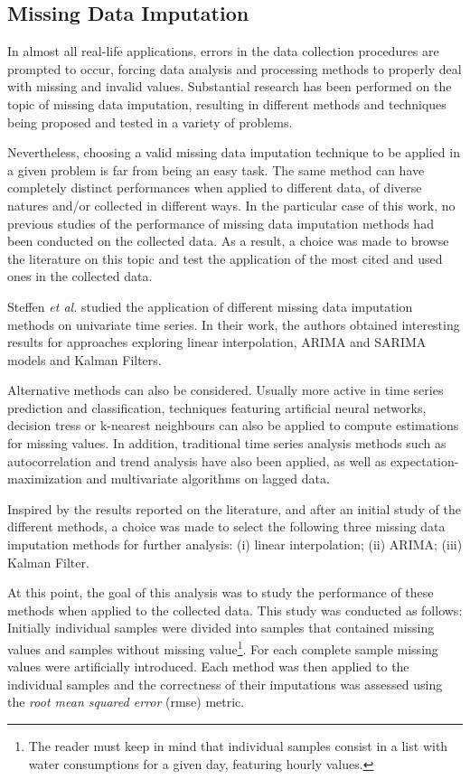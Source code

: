 \documentclass[9pt,journal,compsoc]{IEEEtran}
\begin{document}
\subsection{Missing Data Imputation}

In almost all real-life applications, errors in the data collection procedures are prompted to occur, forcing data analysis and processing methods to properly deal with missing and invalid values. Substantial research has been performed on the topic of missing data imputation, resulting in different methods and techniques being proposed and tested in a variety of problems.

Nevertheless, choosing a valid missing data imputation technique to be applied in a given problem is far from being an easy task. The same method can have completely distinct performances when applied to different data, of diverse natures and/or collected in different ways. In the particular case of this work, no previous studies of the performance of missing data imputation methods had been conducted on the collected data. As a result, a choice was made to browse the literature on this topic and test the application of the most cited and used ones in the collected data.

Steffen \emph{et al.}\cite{moritz2015comparison} studied the application of different missing data imputation methods on univariate time series. In their work, the authors obtained interesting results for approaches exploring linear interpolation, ARIMA and SARIMA models and Kalman Filters. 

Alternative methods can also be considered. Usually more active in time series prediction and classification, techniques featuring artificial neural networks, decision tress or k-nearest neighbours\cite{troyanskaya2001missing, yu2014short} can also be applied to compute estimations for missing values. In addition, traditional time series analysis methods such as autocorrelation and trend analysis have also been applied\cite{abreu2012using}, as well as expectation-maximization and multivariate algorithms on lagged data\cite{moritz2015comparison}.

Inspired by the results reported on the literature, and after an initial study of the different methods, a choice was made to select the following three missing data imputation methods for further analysis: (i) linear interpolation; (ii) ARIMA; (iii) Kalman Filter.

At this point, the goal of this analysis was to study the performance of these methods when applied to the collected data. This study was conducted as follows: Initially individual samples were divided into samples that contained missing values and samples without missing value\footnote{The reader must keep in mind that individual samples consist in a list with water consumptions for a given day, featuring hourly values.}. For each complete sample missing values were artificially introduced. Each method was then applied to the individual samples and the correctness of their imputations was assessed using the \emph{root mean squared error} (rmse) metric.
\end{document}
